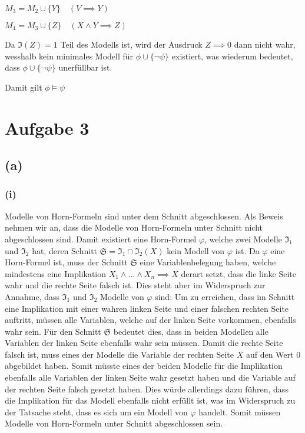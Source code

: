 \documentclass[11pt, a4paper]{article}
\newcommand{\n}{\wedge}
\begin{document}
$M_3 = M_2 \cup \{Y\} \quad (V \implies Y)$

$M_4 = M_3 \cup \{Z\} \quad (X \n Y \implies Z)$

Da $\mathfrak{I}(Z) = 1$ Teil des Modells ist, wird der Ausdruck $Z \implies 0$ dann nicht wahr, wesshalb kein minimales Modell für $\phi \cup \{ \neg \psi \}$ existiert, was wiederum bedeutet, dass $\phi \cup \{ \neg \psi \}$ unerfüllbar ist.

Damit gilt $\phi \models \psi$
\section*{Aufgabe 3}
\subsection*{(a)}

\subsubsection*{(i)}
Modelle von Horn-Formeln sind unter dem Schnitt abgeschlossen. Als Beweis nehmen wir an, dass die Modelle von Horn-Formeln unter Schnitt nicht abgeschlossen sind. Damit existiert eine Horn-Formel $\varphi$, welche zwei Modelle $\mathfrak{I}_1$ und $\mathfrak{I}_2$ hat, deren Schnitt $\mathfrak{S} = \mathfrak{I}_1\cap \mathfrak{I}_2(X)$ kein Modell von $\varphi$ ist. Da $\varphi$ eine Horn-Formel ist, muss der Schnitt $\mathfrak{S}$ eine Variablenbelegung haben, welche mindestens eine Implikation $X_1\wedge ... \wedge X_n\implies X$ derart setzt, dass die linke Seite wahr und die rechte Seite falsch ist. Dies steht aber im Widerspruch zur Annahme, dass $\mathfrak{I}_1$ und $\mathfrak{I}_2$ Modelle von $\varphi$ sind:\newline
Um zu erreichen, dass im Schnitt eine Implikation mit einer wahren linken Seite und einer falschen rechten Seite auftritt, müssen alle Variablen, welche auf der linken Seite vorkommen, ebenfalls wahr sein. Für den Schnitt $\mathfrak{S}$ bedeutet dies, dass in beiden Modellen alle Variablen der linken Seite ebenfalls wahr sein müssen. Damit die rechte Seite falsch ist, muss eines der Modelle die Variable der rechten Seite $X$ auf den Wert $0$ abgebildet haben. Somit müsste eines der beiden Modelle für die Implikation ebenfalls alle Variablen der linken Seite wahr gesetzt haben und die Variable auf der rechten Seite falsch gesetzt haben. Dies würde allerdings dazu führen, dass die Implikation für das Modell ebenfalls nicht erfüllt ist, was im Widerspruch zu der Tatsache steht, dass es sich um ein Modell von $\varphi$ handelt.\newline
Somit müssen Modelle von Horn-Formeln unter Schnitt abgeschlossen sein.\newline\newline
\end{document}
